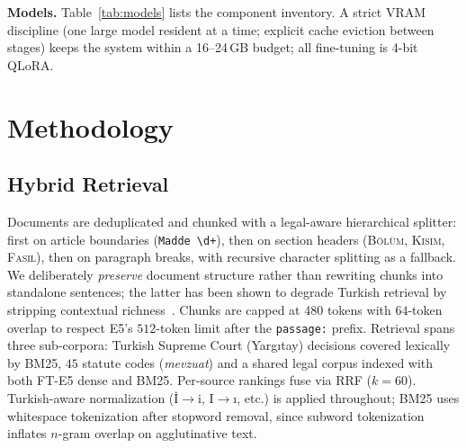 \documentclass[conference]{IEEEtran}
\begin{document}
\textbf{Models.} Table~\ref{tab:models} lists the component inventory. A strict
VRAM discipline (one large model resident at a time; explicit cache eviction
between stages) keeps the system within a 16--24\,GB budget; all fine-tuning is
4-bit QLoRA.

\begin{table}[t]
\caption{Model inventory.}
\label{tab:models}
\centering\footnotesize
{}
\end{table}

\section{Methodology}
\subsection{Hybrid Retrieval}
Documents are deduplicated and chunked with a legal-aware hierarchical splitter:
first on article boundaries (\texttt{Madde~\textbackslash d+}), then on section
headers (\textsc{B\"{o}l\"{u}m}, \textsc{K\i s\i m}, \textsc{Fas\i l}), then on
paragraph breaks, with recursive character splitting as a fallback. We
deliberately \emph{preserve} document structure rather than rewriting chunks
into standalone sentences; the latter has been shown to degrade Turkish
retrieval by stripping contextual richness~\cite{bikmaz2025bridging}. Chunks are
capped at $480$ tokens with $64$-token overlap to respect E5's $512$-token limit
after the \texttt{passage:} prefix. Retrieval spans three sub-corpora: Turkish
Supreme Court (Yarg\i tay) decisions covered lexically by BM25, $45$ statute
codes (\emph{mevzuat}) and a shared legal corpus indexed with both FT-E5 dense
and BM25. Per-source rankings fuse via RRF ($k{=}60$). Turkish-aware
normalization (\.{I}$\to$i, I$\to$\i, etc.) is applied throughout; BM25 uses
whitespace tokenization after stopword removal, since subword tokenization
inflates $n$-gram overlap on agglutinative text.
\end{document}
